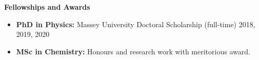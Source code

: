 {\bf\Large Fellowships \textcolor{my_blue}{and Awards}}\\ \vspace*{-6mm}

\begin{itemize}
    \itemsep-1mm
    \item {\bf PhD in Physics:} Massey University Doctoral Scholarship (full-time)
          2018, 2019, 2020
    \item {\bf MSc in Chemistry:} Honours and research work with
          meritorious award.
\end{itemize}
